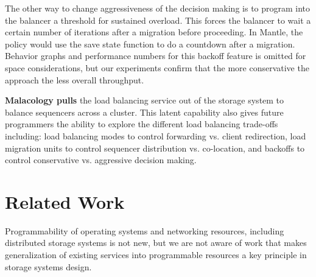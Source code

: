\documentclass[preprint]{sigplanconf-eurosys}
\begin{document}
The other way to change aggressiveness of the decision making is to program
into the balancer a threshold for sustained overload. This forces the balancer
to wait a certain number of iterations after a migration before proceeding. In
Mantle, the policy would use the save state function to do a countdown after a
migration.  Behavior graphs and performance numbers for this backoff feature is
omitted for space considerations, but our experiments confirm that the more
conservative the approach the less overall throughput.
 
\textbf{Malacology pulls} the load balancing service out of the storage system
to balance sequencers across a cluster. This latent capability also gives
future programmers the ability to explore the different load balancing
trade-offs including: load balancing modes to control forwarding vs. client
redirection, load migration units to control sequencer distribution vs.
co-location, and backoffs to control conservative vs. aggressive decision
making.

%
%
%

\section{Related Work}


Programmability of operating systems and networking resources, including
distributed storage systems is not new, but we are not aware of work that makes
generalization of existing services into programmable resources a key principle
in storage systems design. 
\end{document}
